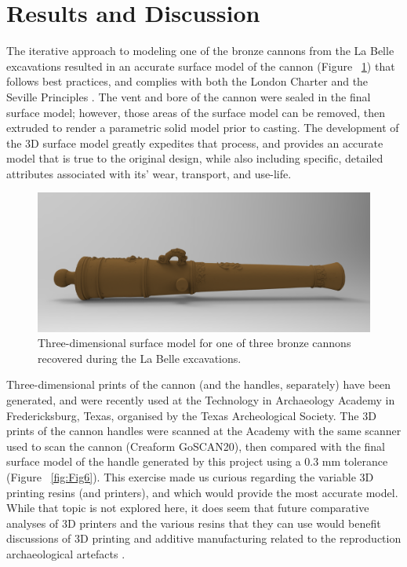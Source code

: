 \documentclass[review]{elsarticle}
\begin{document}
\section*{Results and Discussion}

The iterative approach to modeling one of the bronze cannons from the La Belle excavations resulted in an accurate surface model of the cannon (Figure ~\ref{fig:Fig5}) that follows best practices, and complies with both the London Charter \citep{RN5872} and the Seville Principles \citep{RN5873}. The vent and bore of the cannon were sealed in the final surface model; however, those areas of the surface model can be removed, then extruded to render a parametric solid model prior to casting. The development of the 3D surface model greatly expedites that process, and provides an accurate model that is true to the original design, while also including specific, detailed attributes associated with its' wear, transport, and use-life.

\begin{figure}[ht]\centering
\includegraphics[width=\linewidth]{FigSurfaceModel}
\caption{Three-dimensional surface model for one of three bronze cannons recovered during the La Belle excavations.}
\label{fig:Fig5}
\end{figure}

Three-dimensional prints of the cannon (and the handles, separately) have been generated, and were recently used at the Technology in Archaeology Academy in Fredericksburg, Texas, organised by the Texas Archeological Society. The 3D prints of the cannon handles were scanned at the Academy with the same scanner used to scan the cannon (Creaform GoSCAN20), then compared with the final surface model of the handle generated by this project using a 0.3 mm tolerance (Figure ~\ref{fig:Fig6}). This exercise made us curious regarding the variable 3D printing resins (and printers), and which would provide the most accurate model. While that topic is not explored here, it does seem that future comparative analyses of 3D printers and the various resins that they can use would benefit discussions of 3D printing and additive manufacturing related to the reproduction archaeological artefacts \citep{RN11732}.
\end{document}

